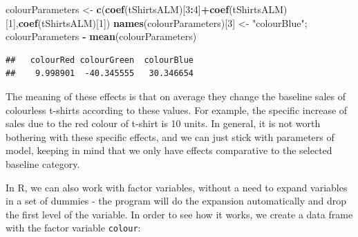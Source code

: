 \documentclass[
]{book}
\newenvironment{Shaded}{\begin{snugshade}}{\end{snugshade}}
\newcommand{\DecValTok}[1]{\textcolor[rgb]{0.00,0.00,0.81}{#1}}
\newcommand{\FunctionTok}[1]{\textcolor[rgb]{0.13,0.29,0.53}{\textbf{#1}}}
\newcommand{\NormalTok}[1]{#1}
\newcommand{\OtherTok}[1]{\textcolor[rgb]{0.56,0.35,0.01}{#1}}
\newcommand{\SpecialCharTok}[1]{\textcolor[rgb]{0.81,0.36,0.00}{\textbf{#1}}}
\newcommand{\StringTok}[1]{\textcolor[rgb]{0.31,0.60,0.02}{#1}}
\theoremstyle{definition}
\theoremstyle{definition}
\theoremstyle{definition}
\theoremstyle{definition}
\theoremstyle{remark}
\begin{document}
\begin{Shaded}
\begin{Highlighting}[]
\NormalTok{colourParameters }\OtherTok{\textless{}{-}} \FunctionTok{c}\NormalTok{(}\FunctionTok{coef}\NormalTok{(tShirtsALM)[}\DecValTok{3}\SpecialCharTok{:}\DecValTok{4}\NormalTok{]}\SpecialCharTok{+}\FunctionTok{coef}\NormalTok{(tShirtsALM)[}\DecValTok{1}\NormalTok{],}\FunctionTok{coef}\NormalTok{(tShirtsALM)[}\DecValTok{1}\NormalTok{])}
\FunctionTok{names}\NormalTok{(colourParameters)[}\DecValTok{3}\NormalTok{] }\OtherTok{\textless{}{-}} \StringTok{"colourBlue"}\NormalTok{;}
\NormalTok{colourParameters }\SpecialCharTok{{-}} \FunctionTok{mean}\NormalTok{(colourParameters)}
\end{Highlighting}
\end{Shaded}

\begin{verbatim}
##   colourRed colourGreen  colourBlue 
##    9.998901  -40.345555   30.346654
\end{verbatim}

The meaning of these effects is that on average they change the baseline sales of colourless t-shirts according to these values. For example, the specific increase of sales due to the red colour of t-shirt is 10 units. In general, it is not worth bothering with these specific effects, and we can just stick with parameters of model, keeping in mind that we only have effects comparative to the selected baseline category.

In R, we can also work with factor variables, without a need to expand variables in a set of dummies - the program will do the expansion automatically and drop the first level of the variable. In order to see how it works, we create a data frame with the factor variable \texttt{colour}:

\begin{Shaded}
\end{Shaded}
\end{document}
